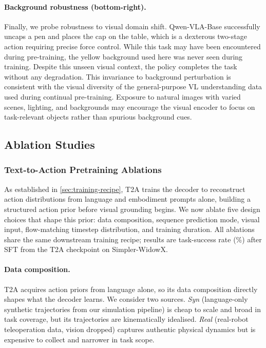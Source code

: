 \documentclass{llmxive}
\begin{document}
\paragraph{Background robustness (bottom-right).}
Finally, we probe robustness to visual domain shift.
Qwen-VLA-Base successfully uncaps a pen and places the cap on the table, which is a dexterous two-stage action requiring precise force control.
While this task may have been encountered during pre-training, the yellow background used here was never seen during training.
Despite this unseen visual context, the policy completes the task without any degradation.
This invariance to background perturbation is consistent with the visual diversity of the general-purpose VL understanding data used during continual pre-training. Exposure to natural images with varied scenes, lighting, and backgrounds may encourage the visual encoder to focus on task-relevant objects rather than spurious background cues.




\subsection{Ablation Studies}
\subsubsection{Text-to-Action Pretraining Ablations}
\label{sec:t2a_ablation}

As established in \cref{sec:training-recipe}, T2A trains the decoder to
reconstruct action distributions from language and embodiment prompts alone,
building a structured action prior before visual grounding begins.
We now ablate five design choices that shape this prior:
data composition, sequence prediction mode, visual input,
flow-matching timestep distribution, and training duration.
All ablations share the same downstream training recipe; results are
task-success rate (\%) after SFT from the T2A checkpoint on Simpler-WidowX.


\paragraph{Data composition.}
\label{sec:t2a_data_ratio}

T2A acquires action priors from language alone, so its
data composition directly shapes what the decoder learns.
We consider two sources.
\emph{Syn} (language-only synthetic trajectories from our simulation pipeline)
is cheap to scale and broad in task coverage, but its trajectories are
kinematically idealised.
\emph{Real} (real-robot teleoperation data, vision dropped) captures authentic
physical dynamics but is expensive to collect and narrower in task scope.
\end{document}
